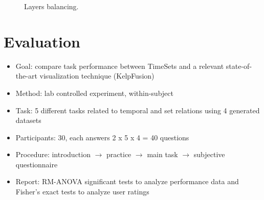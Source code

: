 \begin{figure}[!htb]
	\centering
	\hfill
	\caption{Layers balancing.}
	\label{fig:balancing}
\end{figure}

\section{Evaluation}
\begin{itemize}
	\item Goal: compare task performance between TimeSets and a relevant state-of-the-art visualization technique (KelpFusion)
	\item Method: lab controlled experiment, within-subject
	\item Task: 5 different tasks related to temporal and set relations using 4 generated datasets
	\item Participants: 30, each answers 2 x 5 x 4 = 40 questions
	\item Procedure:  introduction $\rightarrow$ practice $\rightarrow$ main task $\rightarrow$ subjective questionnaire 
	\item Report: RM-ANOVA significant tests to analyze performance data and Fisher's exact tests to analyze user ratings
\end{itemize}


